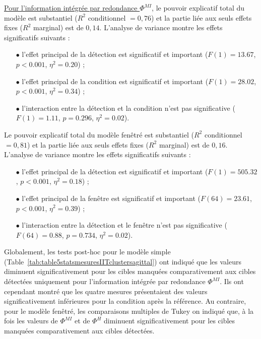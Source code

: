 \underline{Pour l'information intégrée par redondance $\Phi^{MI}$}, le pouvoir explicatif total du modèle est substantiel ($R^2$ conditionnel $=0,76$) et la partie liée aux seuls effets fixes ($R^2$ marginal) est de $0,14$. 
L'analyse de variance montre les effets significatifs suivants : 
\begin{itemize}
\item[$\bullet$] l'effet principal de la détection est significatif et important ($F(1)=13.67$, $p<0.001$, $\eta^2=0.20$) ; 
\item[$\bullet$] l'effet principal de la condition est significatif et important ($F(1)=28.02$, $p<0.001$, $\eta^2=0.34$) ; 
\item[$\bullet$] l'interaction entre la détection et la condition n'est pas significative ($F(1)=1.11$, $p=0.296$, $\eta^2=0.02$).
\end{itemize}
Le pouvoir explicatif total du modèle fenêtré est substantiel ($R^2$ conditionnel $=0,81$) et la partie liée aux seuls effets fixes ($R^2$ marginal) est de $0,16$. 
L'analyse de variance montre les effets significatifs suivants : 
\begin{itemize}
\item[$\bullet$] l'effet principal de la détection est significatif et important ($F(1)=505.32$, $p<0.001$, $\eta^2=0.18$) ; 
\item[$\bullet$] l'effet principal de la fenêtre est significatif et important ($F(64)= 23.61$, $p<0.001$, $\eta^2=0.39$) ; 
\item[$\bullet$] l'interaction entre la détection et le fenêtre n'est pas significative ($F(64)=0.88$, $p=0.734$, $\eta^2=0.02$). \\
\end{itemize}

Globalement, les tests post-hoc pour le modèle simple (Table~\ref{tab:table5statsmesuresIITclustersagittal}) ont indiqué que les valeurs diminuent significativement pour les cibles manquées comparativement aux cibles détectées uniquement pour l'information intégrée par redondance $\Phi^{MI}$. 
Ils ont cependant montré que les quatre mesures présentaient des valeurs significativement inférieures pour la condition après la référence. 
Au contraire, pour le modèle fenêtré, les comparaisons multiples de Tukey on indiqué que, à la fois les valeurs de $\Phi^{MI}$ et de $\Phi^{H}$ diminuent significativement pour les cibles manquées comparativement aux cibles détectées.

